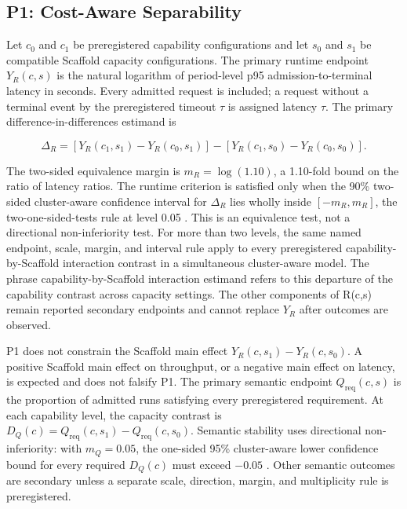 \subsection{P1: Cost-Aware Separability}
\label{sec:p1}

Let $c_0$ and $c_1$ be preregistered capability configurations and let $s_0$ and $s_1$ be compatible Scaffold capacity configurations. The primary runtime endpoint $Y_R(c,s)$ is the natural logarithm of period-level p95 admission-to-terminal latency in seconds. Every admitted request is included; a request without a terminal event by the preregistered timeout $\tau$ is assigned latency $\tau$. The primary difference-in-differences estimand is

\begin{equation}
\Delta_R =
[Y_R(c_1,s_1)-Y_R(c_0,s_1)]
-[Y_R(c_1,s_0)-Y_R(c_0,s_0)].
\end{equation}

The two-sided equivalence margin is $m_R=\log(1.10)$, a 1.10-fold bound on the ratio of latency ratios. The runtime criterion is satisfied only when the 90\% two-sided cluster-aware confidence interval for $\Delta_R$ lies wholly inside $[-m_R,m_R]$, the two-one-sided-tests rule at level 0.05 \cite{schuirmann1987tost}. This is an equivalence test, not a directional non-inferiority test. For more than two levels, the same named endpoint, scale, margin, and interval rule apply to every preregistered capability-by-Scaffold interaction contrast in a simultaneous cluster-aware model. The phrase capability-by-Scaffold interaction estimand refers to this departure of the capability contrast across capacity settings. The other components of R(c,s) remain reported secondary endpoints and cannot replace $Y_R$ after outcomes are observed.

P1 does not constrain the Scaffold main effect $Y_R(c,s_1)-Y_R(c,s_0)$. A positive Scaffold main effect on throughput, or a negative main effect on latency, is expected and does not falsify P1. The primary semantic endpoint $Q_{\mathrm{req}}(c,s)$ is the proportion of admitted runs satisfying every preregistered requirement. At each capability level, the capacity contrast is $D_Q(c)=Q_{\mathrm{req}}(c,s_1)-Q_{\mathrm{req}}(c,s_0)$. Semantic stability uses directional non-inferiority: with $m_Q=0.05$, the one-sided 95\% cluster-aware lower confidence bound for every required $D_Q(c)$ must exceed $-0.05$ \cite{piaggio2012noninferiority}. Other semantic outcomes are secondary unless a separate scale, direction, margin, and multiplicity rule is preregistered.

